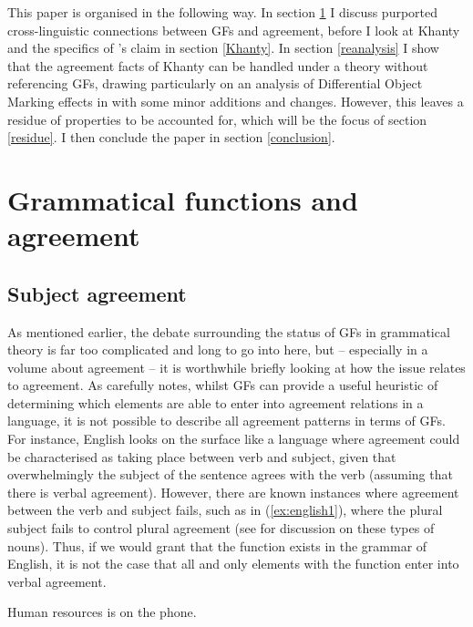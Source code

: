 \documentclass[output=paper
,modfonts
,nonflat]{langsci/langscibook}
\begin{document}
This paper is organised in the following way. In section \ref{gfagr} I discuss purported cross-linguistic connections between GFs and agreement, before I look at Khanty and the specifics of \citet{dn2011}'s claim in section \ref{Khanty}.
In section \ref{reanalysis} I show that the agreement facts of Khanty can be handled under a theory without referencing GFs, drawing particularly on an analysis of Differential Object Marking effects in \citet{Baker2015} with some minor additions and changes.
However, this leaves a residue of properties to be accounted for, which will be the focus of section \ref{residue}.
I then conclude the paper in section \ref{conclusion}.


\section{Grammatical functions and agreement}\label{gfagr}

\subsection{Subject agreement}

As mentioned earlier, the debate surrounding the status of GFs in grammatical theory is far too complicated and long to go into here, but -- especially in a volume about agreement -- it is worthwhile briefly looking at how the issue relates to agreement.
As \citet{corbett2012gr} carefully notes, whilst GFs can provide a useful heuristic of determining which elements are able to enter into agreement relations in a language, it is not possible to describe all agreement patterns in terms of GFs.
For instance, English looks on the surface like a language where agreement could be characterised as taking place between verb and subject, given that overwhelmingly the subject of the sentence agrees with the verb (assuming that there is verbal agreement).
However, there are known instances where agreement between the verb and subject fails, such as in (\ref{ex:english1}), where the plural subject fails to control plural agreement (see \citealt{pollardsag1994} for discussion on these types of nouns). 
Thus, if we would grant that the \subj{} function exists in the grammar of English, it is not the case that all and only elements with the \subj{} function enter into verbal agreement.

\begin{exe}
\ex \label{ex:english1}
Human resources is on the phone.
\end{exe}
\end{document}
